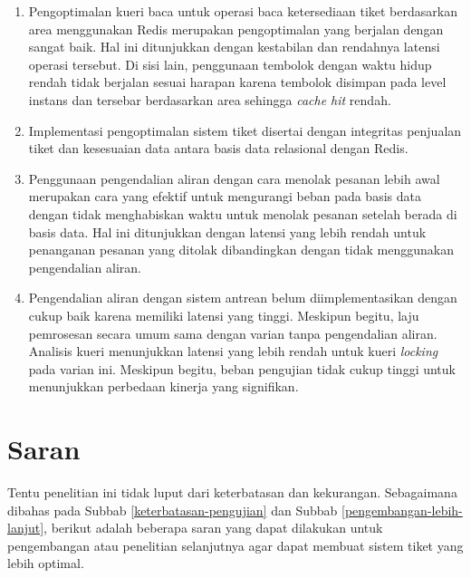 \begin{enumerate}
    \item Pengoptimalan kueri baca untuk operasi baca ketersediaan tiket berdasarkan area menggunakan Redis merupakan pengoptimalan yang berjalan dengan sangat baik. Hal ini ditunjukkan dengan kestabilan dan rendahnya latensi operasi tersebut. Di sisi lain, penggunaan tembolok dengan waktu hidup rendah tidak berjalan sesuai harapan karena tembolok disimpan pada level instans dan tersebar berdasarkan area sehingga \textit{cache hit} rendah.
    \item Implementasi pengoptimalan sistem tiket disertai dengan integritas penjualan tiket dan kesesuaian data antara basis data relasional dengan Redis.
    \item Penggunaan pengendalian aliran dengan cara menolak pesanan lebih awal merupakan cara yang efektif untuk mengurangi beban pada basis data dengan tidak menghabiskan waktu untuk menolak pesanan setelah berada di basis data. Hal ini ditunjukkan dengan latensi yang lebih rendah untuk penanganan pesanan yang ditolak dibandingkan dengan tidak menggunakan pengendalian aliran.
    \item Pengendalian aliran dengan sistem antrean belum diimplementasikan dengan cukup baik karena memiliki latensi yang tinggi. Meskipun begitu, laju pemrosesan secara umum sama dengan varian tanpa pengendalian aliran. Analisis kueri menunjukkan latensi yang lebih rendah untuk kueri \textit{locking} pada varian ini. Meskipun begitu, beban pengujian tidak cukup tinggi untuk menunjukkan perbedaan kinerja yang signifikan.
\end{enumerate}

\pagebreak

\section{Saran}

Tentu penelitian ini tidak luput dari keterbatasan dan kekurangan. Sebagaimana dibahas pada Subbab \ref{keterbatasan-pengujian} dan Subbab \ref{pengembangan-lebih-lanjut}, berikut adalah beberapa saran yang dapat dilakukan untuk pengembangan atau penelitian selanjutnya agar dapat membuat sistem tiket yang lebih optimal.

